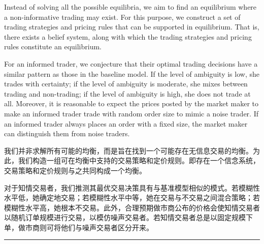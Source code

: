\documentclass[12pt,a4paper]{article}
\newenvironment{original}{%
  \par\vspace{4pt}\noindent%
  \color{black}%
  \ignorespaces
}{%
  \par\vspace{2pt}%
}
\newenvironment{translation}{%
  \par\vspace{2pt}\noindent%
  \color{transblue}%
  \ignorespaces
}{%
  \par\vspace{4pt}\hrule\vspace{6pt}%
}
\begin{document}
\begin{original}
Instead of solving all the possible equilibria, we aim to find an equilibrium where a non-informative trading may exist. For this purpose, we construct a set of trading strategies and pricing rules that can be supported in equilibrium. That is, there exists a belief system, along with which the trading strategies and pricing rules constitute an equilibrium.

For an informed trader, we conjecture that their optimal trading decisions have a similar pattern as those in the baseline model. If the level of ambiguity is low, she trades with certainty; if the level of ambiguity is moderate, she mixes between trading and non-trading; if the level of ambiguity is high, she does not trade at all. Moreover, it is reasonable to expect the prices posted by the market maker to make an informed trader trade with random order size to mimic a noise trader. If an informed trader always places an order with a fixed size, the market maker can distinguish them from noise traders.
\end{original}
\begin{translation}
我们并非求解所有可能的均衡，而是旨在找到一个可能存在无信息交易的均衡。为此，我们构造一组可在均衡中支持的交易策略和定价规则。即存在一个信念系统，交易策略和定价规则与之共同构成一个均衡。

对于知情交易者，我们推测其最优交易决策具有与基准模型相似的模式。若模糊性水平低，她确定地交易；若模糊性水平中等，她在交易与不交易之间混合策略；若模糊性水平高，她根本不交易。此外，合理预期做市商公布的价格会使知情交易者以随机订单规模进行交易，以模仿噪声交易者。若知情交易者总是以固定规模下单，做市商则可将他们与噪声交易者区分开来。
\end{translation}
\end{document}
